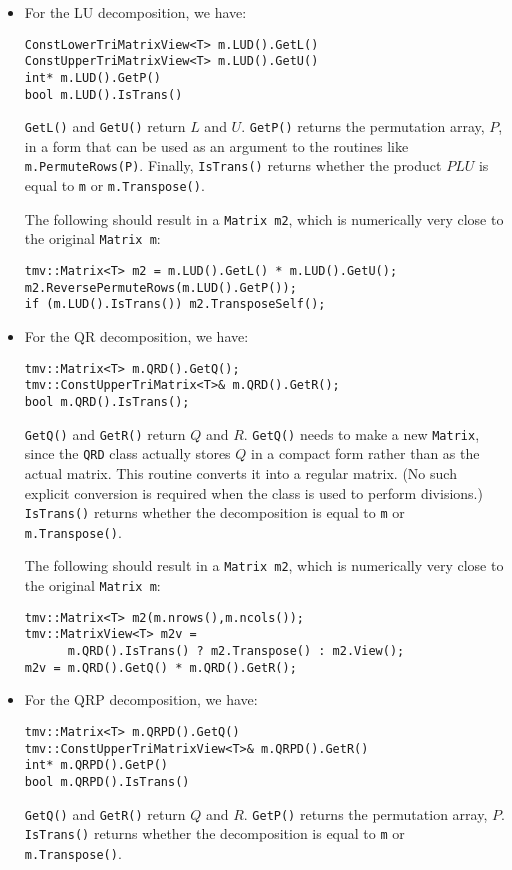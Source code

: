 \documentclass[twoside,letterpaper,11pt]{article}
\renewcommand{\tt}[1]{{\texttt {#1}}}
\begin{document}
\begin{itemize}
\item
For the LU decomposition, we have:
\begin{verbatim}
ConstLowerTriMatrixView<T> m.LUD().GetL()
ConstUpperTriMatrixView<T> m.LUD().GetU()
int* m.LUD().GetP()
bool m.LUD().IsTrans()
\end{verbatim}
\tt{GetL()} and \tt{GetU()} return $L$ and $U$.
\tt{GetP()} returns the permutation array, $P$, in a form
that can be used as an argument 
to the routines like \tt{m.PermuteRows(P)}.  Finally, \tt{IsTrans()} returns whether
the product $PLU$ is equal to \tt{m} or \tt{m.Transpose()}.  

The following should result in a \tt{Matrix m2}, which is numerically very close to
the original \tt{Matrix m}:
\begin{verbatim}
tmv::Matrix<T> m2 = m.LUD().GetL() * m.LUD().GetU();
m2.ReversePermuteRows(m.LUD().GetP());
if (m.LUD().IsTrans()) m2.TransposeSelf();
\end{verbatim}

\item
For the QR decomposition, we have:
\begin{verbatim}
tmv::Matrix<T> m.QRD().GetQ();
tmv::ConstUpperTriMatrix<T>& m.QRD().GetR();
bool m.QRD().IsTrans();
\end{verbatim}
\tt{GetQ()} and \tt{GetR()} return $Q$ and $R$.  \tt{GetQ()} needs to make a new
\tt{Matrix}, since the \tt{QRD} class actually stores $Q$ in a compact form
rather than as the actual matrix.  This routine converts it into a regular matrix.  
(No such explicit conversion is required when the class is used to perform divisions.)
\tt{IsTrans()} returns whether
the decomposition is equal to \tt{m} or \tt{m.Transpose()}.  

The following should result in a \tt{Matrix m2}, which is numerically very close to
the original \tt{Matrix m}:
\begin{verbatim}
tmv::Matrix<T> m2(m.nrows(),m.ncols());
tmv::MatrixView<T> m2v = 
      m.QRD().IsTrans() ? m2.Transpose() : m2.View();
m2v = m.QRD().GetQ() * m.QRD().GetR();
\end{verbatim}

\item
For the QRP decomposition, we have:
\begin{verbatim}
tmv::Matrix<T> m.QRPD().GetQ()
tmv::ConstUpperTriMatrixView<T>& m.QRPD().GetR()
int* m.QRPD().GetP()
bool m.QRPD().IsTrans()
\end{verbatim}
\tt{GetQ()} and \tt{GetR()} return $Q$ and $R$.
\tt{GetP()} returns the permutation array, $P$.
\tt{IsTrans()} returns whether
the decomposition is equal to \tt{m} or \tt{m.Transpose()}.  


\end{itemize}
\end{document}
